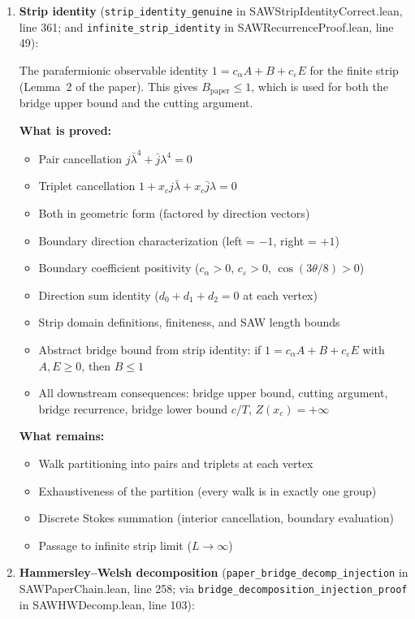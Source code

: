 \begin{lemma}
\begin{enumerate}
\begin{enumerate}
\item \textbf{Strip identity} (\texttt{strip\_identity\_genuine} in
  SAWStripIdentityCorrect.lean, line 361; and \texttt{infinite\_strip\_identity}
  in SAWRecurrenceProof.lean, line 49):

  The parafermionic observable identity $1 = c_\alpha A + B + c_\varepsilon E$
  for the finite strip (Lemma~2 of the paper).
  This gives $B_{\mathrm{paper}} \leq 1$, which is used for both the bridge
  upper bound and the cutting argument.

  \textbf{What is proved:}
  \begin{itemize}
  \item Pair cancellation $j\bar{\lambda}^4 + \bar{j}\lambda^4 = 0$
  \item Triplet cancellation $1 + x_c j \bar{\lambda} + x_c \bar{j}\lambda = 0$
  \item Both in geometric form (factored by direction vectors)
  \item Boundary direction characterization (left = $-1$, right = $+1$)
  \item Boundary coefficient positivity ($c_\alpha > 0$, $c_\varepsilon > 0$, $\cos(3\theta/8) > 0$)
  \item Direction sum identity ($d_0 + d_1 + d_2 = 0$ at each vertex)
  \item Strip domain definitions, finiteness, and SAW length bounds
  \item Abstract bridge bound from strip identity: if $1 = c_\alpha A + B + c_\varepsilon E$
    with $A, E \geq 0$, then $B \leq 1$
  \item All downstream consequences: bridge upper bound, cutting argument,
    bridge recurrence, bridge lower bound $c/T$, $Z(x_c) = +\infty$
  \end{itemize}

  \textbf{What remains:}
  \begin{itemize}
  \item Walk partitioning into pairs and triplets at each vertex
  \item Exhaustiveness of the partition (every walk is in exactly one group)
  \item Discrete Stokes summation (interior cancellation, boundary evaluation)
  \item Passage to infinite strip limit ($L \to \infty$)
  \end{itemize}

\item \textbf{Hammersley--Welsh decomposition}
  (\texttt{paper\_bridge\_decomp\_injection} in SAWPaperChain.lean, line 258;
  via \texttt{bridge\_decomposition\_injection\_proof} in SAWHWDecomp.lean, line 103):


\end{enumerate}
\end{enumerate}
\end{lemma}

